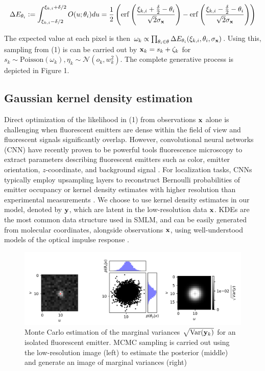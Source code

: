 \documentclass{article}
\begin{document}
\begin{equation}
\Delta E_{\theta_{i}} \vcentcolon = \int_{\xi_{k,i}-\delta /2}^{\xi_{k,i}+\delta /2} O(u;\theta_{i})du = \frac{1}{2}\left(\mathrm{erf}\left(\frac{\xi_{k,i}+\frac{\delta}{2}-\theta_{i}}{\sqrt{2}\sigma_{\bold{x}}}\right) -\mathrm{erf}\left(\frac{\xi_{k,i}-\frac{\delta}{2}-\theta_{i}}{\sqrt{2}\sigma_{\bold{x}}}\right)\right)
\end{equation}

The expected value at each pixel is then $\omega_{k}\propto \prod_{\theta_{i}\in \theta} \Delta E_{\theta_{i}}(\xi_{k,i},\theta_{i},\sigma_{\bold{x}}) $. Using this, sampling from (1) is can be carried out by $\bold{x}_{k} = s_{k} + \zeta_{k}$ for $s_{k}\sim \mathrm{Poisson}(\omega_{k}), \eta_{k}\sim \mathcal{N}(o_{k},w_{k}^{2})$. The complete generative process is depicted in Figure 1. 

\subsection{Gaussian kernel density estimation}

Direct optimization of the likelihood in (1) from observations $\bold{x}$ alone is challenging when fluorescent emitters are dense within the field of view and fluorescent signals significantly overlap. However, convolutional neural networks (CNN) have recently proven to be powerful tools fluorescence microscopy to extract parameters describing fluorescent emitters such as color, emitter orientation, $z$-coordinate, and background signal \cite{Zhang2018,Kim2019,Zelger2018}. For localization tasks, CNNs typically employ upsampling layers to reconstruct Bernoulli probabilities of emitter occupancy \citep{Speiser2021} or kernel density estimates with higher resolution than experimental measurements \citep{Nehme2020}. We choose to use kernel density estimates in our model, denoted by $\bold{y}$, which are latent in the low-resolution data $\bold{x}$. KDEs are the most common data structure used in SMLM, and can be easily generated from molecular coordinates, alongside observations $\bold{x}$, using well-understood models of the optical impulse response \citep{Zhang2007}. 

\begin{figure}
\includegraphics[scale=0.7]{media/MCMC.png}
\caption{Monte Carlo estimation of the marginal variances $\sqrt{\mathrm{Var}(\bold{y}_k)}$ for an isolated fluorescent emitter. MCMC sampling is carried out using the low-resolution image (left) to estimate the posterior (middle) and generate an image of marginal variances (right)}
\end{figure}
\end{document}
